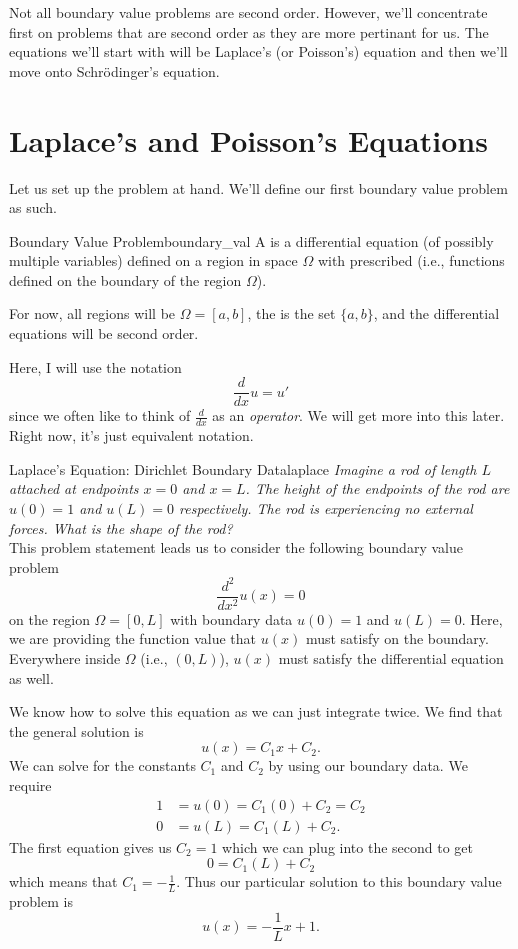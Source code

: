 Not all boundary value problems are second order.  However, we'll concentrate first on problems that are second order as they are more pertinant for us.  The equations we'll start with will be Laplace's (or Poisson's) equation and then we'll move onto Schr\"odinger's equation.

\section{Laplace's and Poisson's Equations}

Let us set up the problem at hand.  We'll define our first boundary value problem as such.
\begin{df}{Boundary Value Problem}{boundary_val}
A  is a differential equation (of possibly multiple variables) defined on a region in space $\Omega$ with prescribed  (i.e., functions defined on the boundary of the region $\Omega$).  

For now, all regions will be $\Omega=[a,b]$, the  is the set $\{a,b\}$, and the differential equations will be second order.
\end{df}

\begin{remark}
Here, I will use the notation
\[
\frac{d}{dx}u=u'
\]
since we often like to think of $\frac{d}{dx}$ as an \emph{operator}.  We will get more into this later. Right now, it's just equivalent notation.
\end{remark}

\begin{ex}{Laplace's Equation: Dirichlet Boundary Data}{laplace}
\emph{Imagine a rod of length $L$ attached at endpoints $x=0$ and $x=L$.  The height of the endpoints of the rod are $u(0)=1$ and $u(L)=0$ respectively.  The rod is experiencing no external forces.  What is the shape of the rod?}\\

This problem statement leads us to consider the following boundary value problem
\[
\frac{d^2}{dx^2}u(x)=0
\]
on the region $\Omega = [0,L]$ with boundary data $u(0)=1$ and $u(L)=0$. Here, we are providing the function value that $u(x)$ must satisfy on the boundary.  Everywhere inside $\Omega$ (i.e., $(0,L)$), $u(x)$ must satisfy the differential equation as well. 

We know how to solve this equation as we can just integrate twice.  We find that the general solution is
\[
u(x)=C_1 x + C_2.
\]
We can solve for the constants $C_1$ and $C_2$ by using our boundary data. We require
\begin{align*}
    1&=u(0)=C_1(0)+C_2=C_2\\
    0&=u(L)=C_1(L)+C_2.
\end{align*}
The first equation gives us $C_2=1$ which we can plug into the second to get
\[
0=C_1(L)+C_2
\]
which means that $C_1=-\frac{1}{L}$.  Thus our particular solution to this boundary value problem is
\[
\boxed{u(x)=-\frac{1}{L}x+1.}
\]
\end{ex}

